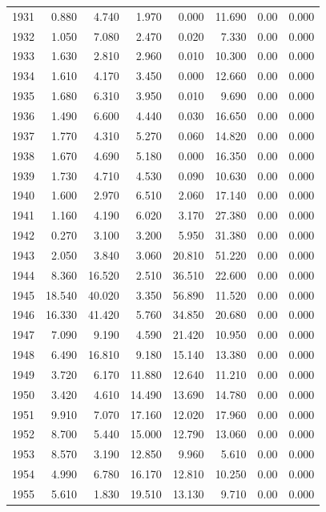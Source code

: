 \documentclass[
]{scrartcl}
\begin{document}
\begin{longtable}{rrrrrrrr}
1931 & 0.880 & 4.740 & 1.970 & 0.000 & 11.690 & 0.00 & 0.000 \\ 
1932 & 1.050 & 7.080 & 2.470 & 0.020 & 7.330 & 0.00 & 0.000 \\ 
1933 & 1.630 & 2.810 & 2.960 & 0.010 & 10.300 & 0.00 & 0.000 \\ 
1934 & 1.610 & 4.170 & 3.450 & 0.000 & 12.660 & 0.00 & 0.000 \\ 
1935 & 1.680 & 6.310 & 3.950 & 0.010 & 9.690 & 0.00 & 0.000 \\ 
1936 & 1.490 & 6.600 & 4.440 & 0.030 & 16.650 & 0.00 & 0.000 \\ 
1937 & 1.770 & 4.310 & 5.270 & 0.060 & 14.820 & 0.00 & 0.000 \\ 
1938 & 1.670 & 4.690 & 5.180 & 0.000 & 16.350 & 0.00 & 0.000 \\ 
1939 & 1.730 & 4.710 & 4.530 & 0.090 & 10.630 & 0.00 & 0.000 \\ 
1940 & 1.600 & 2.970 & 6.510 & 2.060 & 17.140 & 0.00 & 0.000 \\ 
1941 & 1.160 & 4.190 & 6.020 & 3.170 & 27.380 & 0.00 & 0.000 \\ 
1942 & 0.270 & 3.100 & 3.200 & 5.950 & 31.380 & 0.00 & 0.000 \\ 
1943 & 2.050 & 3.840 & 3.060 & 20.810 & 51.220 & 0.00 & 0.000 \\ 
1944 & 8.360 & 16.520 & 2.510 & 36.510 & 22.600 & 0.00 & 0.000 \\ 
1945 & 18.540 & 40.020 & 3.350 & 56.890 & 11.520 & 0.00 & 0.000 \\ 
1946 & 16.330 & 41.420 & 5.760 & 34.850 & 20.680 & 0.00 & 0.000 \\ 
1947 & 7.090 & 9.190 & 4.590 & 21.420 & 10.950 & 0.00 & 0.000 \\ 
1948 & 6.490 & 16.810 & 9.180 & 15.140 & 13.380 & 0.00 & 0.000 \\ 
1949 & 3.720 & 6.170 & 11.880 & 12.640 & 11.210 & 0.00 & 0.000 \\ 
1950 & 3.420 & 4.610 & 14.490 & 13.690 & 14.780 & 0.00 & 0.000 \\ 
1951 & 9.910 & 7.070 & 17.160 & 12.020 & 17.960 & 0.00 & 0.000 \\ 
1952 & 8.700 & 5.440 & 15.000 & 12.790 & 13.060 & 0.00 & 0.000 \\ 
1953 & 8.570 & 3.190 & 12.850 & 9.960 & 5.610 & 0.00 & 0.000 \\ 
1954 & 4.990 & 6.780 & 16.170 & 12.810 & 10.250 & 0.00 & 0.000 \\ 
1955 & 5.610 & 1.830 & 19.510 & 13.130 & 9.710 & 0.00 & 0.000 \\ 

\end{longtable}
\end{document}
